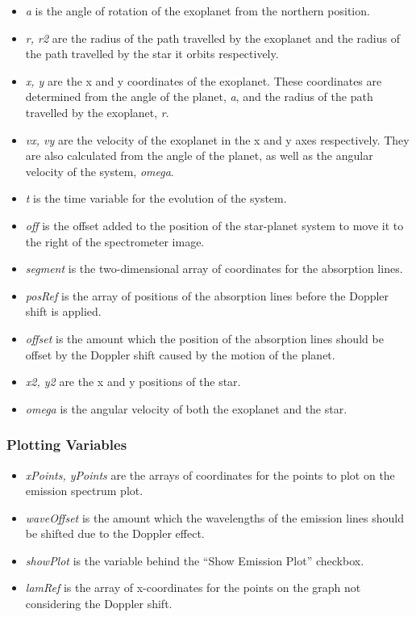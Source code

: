 \documentclass[11pt]{article}
\begin{document}
\begin{itemize}
\item \emph{a} is the angle of rotation of the exoplanet from the northern position.
\item \emph{r, r2} are the radius of the path travelled by the exoplanet and
  the radius of the path travelled by the star it orbits respectively.
\item \emph{x, y} are the x and y coordinates of the exoplanet. These
  coordinates are determined from the angle of the planet, \emph{a}, and
  the radius of the path travelled by the exoplanet, \emph{r}.
\item \emph{vx, vy} are the velocity of the exoplanet in the x and y axes
  respectively. They are also calculated from the angle of the planet,
  as well as the angular velocity of the system, \emph{omega}.
\item \emph{t} is the time variable for the evolution of the system.
\item \emph{off} is the offset added to the position of the star-planet
  system to move it to the right of the spectrometer image.
\item \emph{segment} is the two-dimensional array of coordinates for the absorption lines.
\item \emph{posRef} is the array of positions of the absorption lines before
  the Doppler shift is applied.
\item \emph{offset} is the amount which the position of the absorption lines should be offset by the Doppler shift caused by the motion of the planet.
\item \emph{x2, y2} are the x and y positions of the star.
\item \emph{omega} is the angular velocity of both the exoplanet and the star.
\end{itemize}
\subsubsection*{Plotting Variables}
\label{sec-3-1-1}

\begin{itemize}
\item \emph{xPoints, yPoints} are the arrays of coordinates for the points to plot on the emission spectrum plot.
\item \emph{waveOffset} is the amount which the wavelengths of the emission lines should be shifted due to the Doppler effect.
\item \emph{showPlot} is the variable behind the ``Show Emission Plot'' checkbox.
\item \emph{lamRef} is the array of x-coordinates for the points on the graph not considering the Doppler shift.
\end{itemize}
\end{document}
